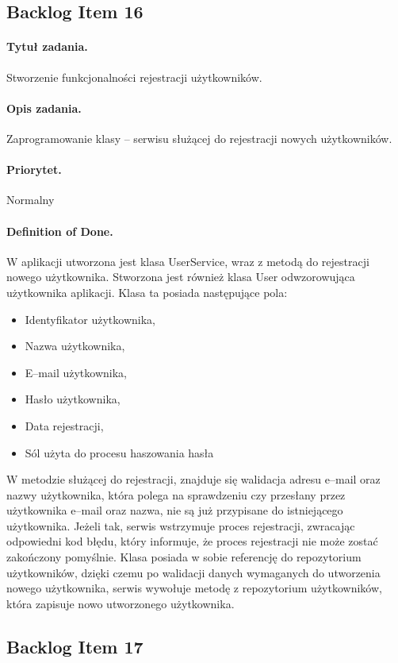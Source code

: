 \documentclass[a4paper]{article}
\begin{document}
\subsection{Backlog Item 16} 
\paragraph{Tytuł zadania.} Stworzenie funkcjonalności rejestracji użytkowników. 
\paragraph{Opis zadania.} Zaprogramowanie klasy -- serwisu służącej do rejestracji nowych użytkowników. 
\paragraph{Priorytet.} Normalny
\paragraph{Definition of Done.} W aplikacji utworzona jest klasa UserService, wraz z metodą do rejestracji nowego użytkownika. Stworzona jest również klasa User odwzorowująca użytkownika aplikacji. Klasa ta posiada następujące pola: 
\begin{itemize}
\item Identyfikator użytkownika, 
\item Nazwa użytkownika,
\item E--mail użytkownika, 
\item Hasło użytkownika, 
\item Data rejestracji, 
\item Sól użyta do procesu haszowania hasła
\end{itemize}
W metodzie służącej do rejestracji, znajduje się walidacja adresu e--mail oraz nazwy użytkownika, która polega na sprawdzeniu czy przesłany przez użytkownika e--mail oraz nazwa, nie są już przypisane do istniejącego użytkownika. Jeżeli tak, serwis wstrzymuje proces rejestracji, zwracając odpowiedni kod błędu, który informuje, że proces rejestracji nie może zostać zakończony pomyślnie. Klasa posiada w sobie referencję do repozytorium użytkowników, dzięki czemu po walidacji danych wymaganych do utworzenia nowego użytkownika, serwis wywołuje metodę z repozytorium użytkowników, która zapisuje nowo utworzonego użytkownika. 

\subsection{Backlog Item 17} 
\end{document}
